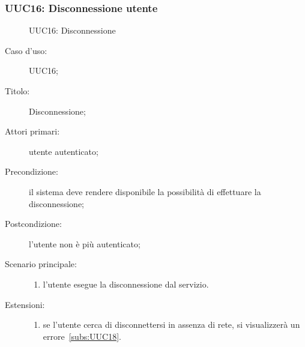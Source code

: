\documentclass[../../../analisi-dei-requisiti.tex]{subfiles}
\begin{document}
\subsubsection{UUC16: Disconnessione utente}%
\label{subs:UU16}

\begin{figure}[H]
  \centering
  \caption{UUC16: Disconnessione}%
  \label{fig:UUC16}
\end{figure}

\begin{description}
  \item[Caso d'uso:] UUC16;
  \item[Titolo:] Disconnessione;
  \item[Attori primari:] utente autenticato;
  \item[Precondizione:] il sistema deve rendere disponibile la possibilità di effettuare la disconnessione;
  \item[Postcondizione:] l'utente non è più autenticato;
  \item[Scenario principale:]
        \begin{enumerate}
          \item l'utente esegue la disconnessione dal servizio.
        \end{enumerate}
  \item[Estensioni:]
        \begin{enumerate}
          \item se l'utente cerca di disconnettersi in assenza di rete, si visualizzerà un errore~\ref{subs:UUC18}.
        \end{enumerate}
\end{description}
\end{document}
